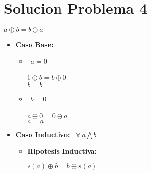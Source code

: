 \documentclass[10pt,a4paper]{article}
\begin{document}
\section*{Solucion Problema 4}
\begin{center}
$ a\oplus b = b\oplus a $
\end{center}
\begin{itemize}
\item \textbf{Caso Base:} 
\begin{itemize}
\item \ $ a=0$
\begin{center}
 $ 0\oplus b = b\oplus 0$
 \
 \\ $ b=b$
\end{center}
\item \ $b=0$
\begin{center}
$ a\oplus 0 = 0\oplus a $
\
\\ $ a=a$
\end{center}

\end{itemize}
\item \textbf{Caso Inductivo: } \ $ \forall \ a \bigwedge b $
\begin{itemize}
\item \textbf{Hipotesis Inductiva: } 
\begin{center}
$ s(a)\oplus b = b\oplus s(a) $
\end{center}
\end{itemize}

\end{itemize}
\end{document}
